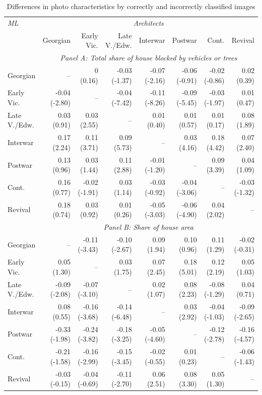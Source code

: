 \documentclass[]{article}
\begin{document}
\begin{table}[!htb] 
\caption{Differences in photo characteristics by correctly and incorrectly classified images} 
\label{tab:diffimgchar} 
\centering 
\begingroup\scriptsize 
\begin{tabular}{lrrrrrrr}

\toprule 

\emph{ML} & \multicolumn{7}{c}{\emph{Architects}} \\ 
  \cmidrule(lr){2-8} 
& Georgian & Early Vic. & Late V./Edw. & Interwar & Postwar & Cont. & Revival \\  

 \cmidrule(lr){2-8} 
 & \multicolumn{7}{c}{\emph{ Panel A: Total share of house blocked by vehicles or trees}}\\ 
\cmidrule(lr){1-1} \cmidrule(lr){2-8} 

Georgian &  -- &  0 (0.16) & -0.03 (-1.37) & -0.07 (-2.16) & -0.06 (-0.91) & -0.02 (-0.86) &  0.02 (0.39) \\  
  Early Vic. & -0.04 (-2.80) &  -- & -0.04 (-7.42) & -0.11 (-8.26) & -0.09 (-5.45) & -0.03 (-1.97) &  0.01 (0.47) \\  
  Late V./Edw. &  0.03 (0.91) &  0.03 (2.55) &  -- &  0.01 (0.40) &  0.01 (0.57) &  0.01 (0.17) &  0.08 (1.89) \\  
  Interwar &  0.17 (2.24) &  0.11 (3.71) &  0.09 (5.73) &  -- &  0.03 (4.16) &  0.18 (4.42) &  0.07 (2.40) \\  
  Postwar &  0.13 (0.96) &  0.03 (1.44) &  0.11 (2.88) & -0.01 (-1.20) &  -- &  0.09 (3.39) &  0.04 (1.09) \\  
  Cont. &  0.16 (0.77) & -0.02 (-1.91) &  0.03 (1.14) & -0.03 (-0.92) & -0.04 (-3.06) &  -- & -0.03 (-1.32) \\  
  Revival &  0.18 (0.74) &  0.03 (0.92) &  0.01 (0.26) & -0.05 (-3.03) & -0.06 (-4.90) &  0.04 (2.02) &  -- \\  

\cmidrule(lr){1-1} \cmidrule(lr){2-8} 
 & \multicolumn{7}{c}{\emph{ Panel B: Share of house area}}\\ 
\cmidrule(lr){1-1} \cmidrule(lr){2-8} 

  Georgian &  -- & -0.11 (-3.43) & -0.10 (-2.67) &  0.09 (1.94) &  0.10 (0.96) &  0.11 (1.29) & -0.02 (-0.31) \\  
  Early Vic. &  0.05 (1.30) &  -- &  0.03 (1.75) &  0.07 (2.45) &  0.18 (5.01) &  0.12 (2.19) &  0.05 (1.03) \\  
  Late V./Edw. & -0.09 (-2.08) & -0.07 (-3.10) &  -- &  0.02 (1.07) &  0.08 (2.23) & -0.08 (-1.29) &  0.04 (0.71) \\  
  Interwar &  0.08 (0.55) & -0.16 (-3.68) & -0.14 (-6.48) &  -- &  0.03 (2.92) & -0.04 (-1.03) & -0.09 (-2.65) \\  
  Postwar & -0.33 (-1.98) & -0.24 (-3.82) & -0.18 (-3.25) & -0.05 (-4.60) &  -- & -0.12 (-2.78) & -0.16 (-4.57) \\  
  Cont. & -0.21 (-1.58) & -0.16 (-2.99) & -0.15 (-3.45) & -0.02 (-0.55) &  0.01 (0.23) &  -- & -0.06 (-1.43) \\  
  Revival & -0.03 (-0.15) & -0.04 (-0.69) & -0.11 (-2.70) &  0.06 (2.51) &  0.08 (3.30) &  0.05 (1.30) &  -- \\  


\end{tabular}
\end{table}
\end{document}
